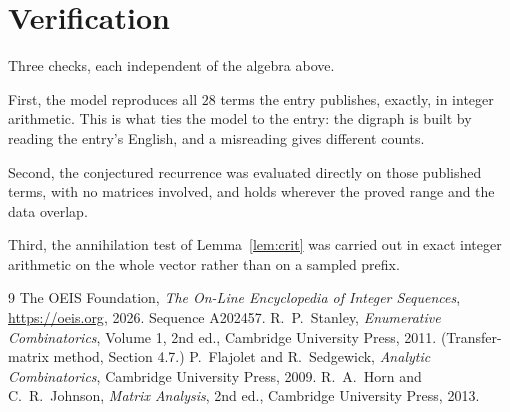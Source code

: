 \documentclass[11pt,a4paper]{article}
\theoremstyle{plain}
\theoremstyle{definition}
\begin{document}
\section{Verification}

Three checks, each independent of the algebra above.

First, the model reproduces all $28$ terms the entry publishes, exactly, in integer
arithmetic. This is what ties the model to the entry: the digraph is built by reading the
entry's English, and a misreading gives different counts.

Second, the conjectured recurrence was evaluated directly on those published terms, with no
matrices involved, and holds wherever the proved range and the data overlap.

Third, the annihilation test of Lemma~\ref{lem:crit} was carried out in exact integer
arithmetic on the whole vector rather than on a sampled prefix.

\begin{thebibliography}{9}
 The OEIS Foundation, \emph{The On-Line Encyclopedia of Integer
Sequences}, \url{https://oeis.org}, 2026. Sequence A202457.
 R.~P.~Stanley, \emph{Enumerative Combinatorics}, Volume 1, 2nd ed.,
Cambridge University Press, 2011. (Transfer-matrix method, Section 4.7.)
 P.~Flajolet and R.~Sedgewick, \emph{Analytic Combinatorics}, Cambridge
University Press, 2009.
 R.~A.~Horn and C.~R.~Johnson, \emph{Matrix Analysis}, 2nd ed., Cambridge
University Press, 2013.
\end{thebibliography}
\end{document}
